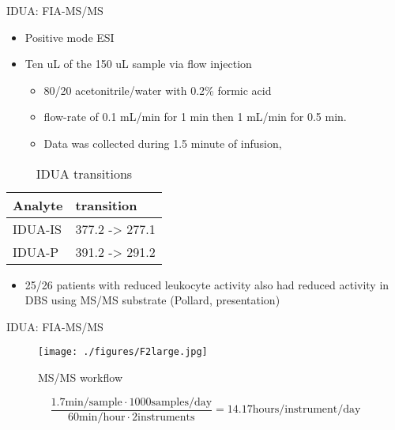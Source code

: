 \documentclass[presentation, smaller]{beamer}
\begin{document}
\begin{frame}[label={sec:org75de139}]{IDUA: FIA-MS/MS}
\begin{itemize}
\item Positive mode ESI
\item Ten uL of the 150 uL sample via flow injection
\begin{itemize}
\item 80/20 acetonitrile/water with 0.2\% formic acid
\item flow-rate of 0.1 mL/min for 1 min then 1 mL/min for 0.5 min.
\item Data was collected during 1.5 minute of infusion,
\end{itemize}
\end{itemize}

\begin{table}[htbp]
\caption{\label{tab:orgbe481db}
IDUA transitions}
\centering
\begin{tabular}{ll}
Analyte & transition\\
\hline
IDUA-IS & 377.2 -> 277.1\\
IDUA-P & 391.2 -> 291.2\\
\end{tabular}
\end{table}

\begin{itemize}
\item 25/26 patients with reduced leukocyte activity also had reduced
activity in DBS using MS/MS substrate (Pollard, presentation)
\end{itemize}
\end{frame}

\begin{frame}[label={sec:org1c85205}]{IDUA: FIA-MS/MS}
\begin{figure}[htbp]
\centering
\texttt{[image: ./figures/F2large.jpg]}
\caption{\label{fig:org39b3027}
MS/MS workflow}
\end{figure}


\[
\frac{1.7 \text{min/sample} \cdot 1000 \text{samples/day}}{60 \text{min/hour} \cdot 2 \text{instruments}}
= 14.17 \text{hours/instrument/day}
\]
\end{frame}
\end{document}
